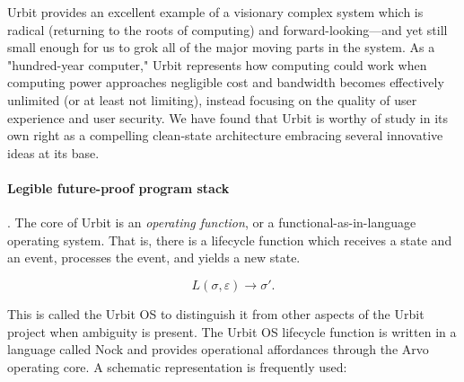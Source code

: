 Urbit provides an excellent example of a visionary complex system which is radical (returning to the roots of computing) and forward-looking—and yet still small enough for us to grok all of the major moving parts in the system.  As a "hundred-year computer," Urbit represents how computing could work when computing power approaches negligible cost and bandwidth becomes effectively unlimited (or at least not limiting), instead focusing on the quality of user experience and user security.  We have found that Urbit is worthy of study in its own right as a compelling clean-state architecture embracing several innovative ideas at its base.

\paragraph{Legible future-proof program stack}.  The core of Urbit is an \emph{operating function}, or a functional-as-in-language operating system.  That is, there is a lifecycle function which receives a state and an event, processes the event, and yields a new state.

$$
L
(\sigma,\varepsilon)
\rightarrow
\sigma'
\textrm{.}
$$

This is called the Urbit OS to distinguish it from other aspects of the Urbit project when ambiguity is present.  The Urbit OS lifecycle function is written in a language called Nock and provides operational affordances through the Arvo operating core.  A schematic representation is frequently used:

